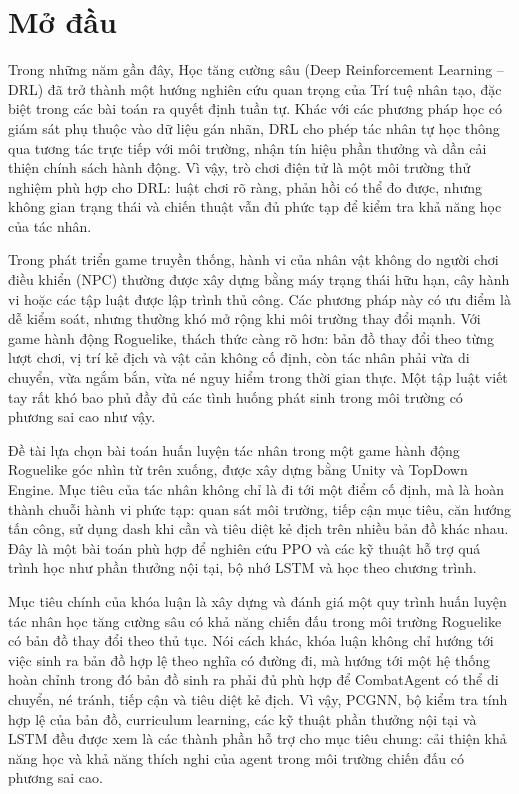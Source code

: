 \clearpage
{}

\chapter*{Mở đầu}


Trong những năm gần đây, Học tăng cường sâu (Deep Reinforcement Learning -- DRL) đã trở thành một hướng nghiên cứu quan trọng của Trí tuệ nhân tạo, đặc biệt trong các bài toán ra quyết định tuần tự. Khác với các phương pháp học có giám sát phụ thuộc vào dữ liệu gán nhãn, DRL cho phép tác nhân tự học thông qua tương tác trực tiếp với môi trường, nhận tín hiệu phần thưởng và dần cải thiện chính sách hành động. Vì vậy, trò chơi điện tử là một môi trường thử nghiệm phù hợp cho DRL: luật chơi rõ ràng, phản hồi có thể đo được, nhưng không gian trạng thái và chiến thuật vẫn đủ phức tạp để kiểm tra khả năng học của tác nhân.

Trong phát triển game truyền thống, hành vi của nhân vật không do người chơi điều khiển (NPC) thường được xây dựng bằng máy trạng thái hữu hạn, cây hành vi hoặc các tập luật được lập trình thủ công. Các phương pháp này có ưu điểm là dễ kiểm soát, nhưng thường khó mở rộng khi môi trường thay đổi mạnh. Với game hành động Roguelike, thách thức càng rõ hơn: bản đồ thay đổi theo từng lượt chơi, vị trí kẻ địch và vật cản không cố định, còn tác nhân phải vừa di chuyển, vừa ngắm bắn, vừa né nguy hiểm trong thời gian thực. Một tập luật viết tay rất khó bao phủ đầy đủ các tình huống phát sinh trong môi trường có phương sai cao như vậy.

Đề tài lựa chọn bài toán huấn luyện tác nhân trong một game hành động Roguelike góc nhìn từ trên xuống, được xây dựng bằng Unity và TopDown Engine. Mục tiêu của tác nhân không chỉ là đi tới một điểm cố định, mà là hoàn thành chuỗi hành vi phức tạp: quan sát môi trường, tiếp cận mục tiêu, căn hướng tấn công, sử dụng dash khi cần và tiêu diệt kẻ địch trên nhiều bản đồ khác nhau. Đây là một bài toán phù hợp để nghiên cứu PPO và các kỹ thuật hỗ trợ quá trình học như phần thưởng nội tại, bộ nhớ LSTM và học theo chương trình.
\newpage
\vspace{0.3cm}

Mục tiêu chính của khóa luận là xây dựng và đánh giá một quy trình huấn luyện tác nhân học tăng cường sâu có khả năng chiến đấu trong môi trường Roguelike có bản đồ thay đổi theo thủ tục. Nói cách khác, khóa luận không chỉ hướng tới việc sinh ra bản đồ hợp lệ theo nghĩa có đường đi, mà hướng tới một hệ thống hoàn chỉnh trong đó bản đồ sinh ra phải đủ phù hợp để CombatAgent có thể di chuyển, né tránh, tiếp cận và tiêu diệt kẻ địch. Vì vậy, PCGNN, bộ kiểm tra tính hợp lệ của bản đồ, curriculum learning, các kỹ thuật phần thưởng nội tại và LSTM đều được xem là các thành phần hỗ trợ cho mục tiêu chung: cải thiện khả năng học và khả năng thích nghi của agent trong môi trường chiến đấu có phương sai cao.

